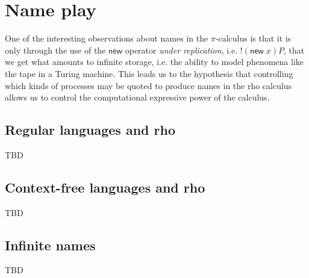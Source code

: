 \section{Name play}
One of the interesting observations about names in the
${\pi}$-calculus is that it is only through the use of the
$\mathsf{new}$ operator \emph{under replication},
i.e. $\mathsf{!}(\mathsf{new}\; x)P$, that we get what amounts to
infinite storage, i.e. the ability to model phenomena like the tape in
a Turing machine. This leads us to the hypothesis that controlling
which kinds of processes may be quoted to produce names in the rho
calculus allows us to control the computational expressive power of
the calculus.

\subsection{Regular languages and rho}
TBD

\subsection{Context-free languages and rho}
TBD

\subsection{Infinite names}
TBD
